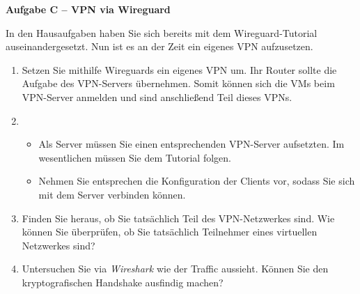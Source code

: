 \documentclass[paper=a4,fontsize=11pt]{scrartcl}%
\numberwithin{equation}{section}
\begin{document}
\begin{center}\Large{\textbf{Aufgabe C -- VPN via Wireguard}}\end{center}\vskip0.25in
In den Hausaufgaben haben Sie sich bereits mit dem Wireguard-Tutorial auseinandergesetzt. Nun ist es an der Zeit ein eigenes VPN aufzusetzen.
\begin{enumerate}
	\item Setzen Sie mithilfe Wireguards ein eigenes VPN um. Ihr Router sollte die Aufgabe des VPN-Servers übernehmen. Somit können sich die VMs beim VPN-Server anmelden und sind anschließend Teil dieses VPNs.
	\item 
	\begin{itemize}
		\item Als Server müssen Sie einen entsprechenden VPN-Server aufsetzten. Im wesentlichen müssen Sie dem Tutorial folgen.
		\item Nehmen Sie entsprechen die Konfiguration der Clients vor, sodass Sie sich mit dem Server verbinden können.
	\end{itemize}
	\item Finden Sie heraus, ob Sie tatsächlich Teil des VPN-Netzwerkes sind. Wie können Sie überprüfen, ob Sie tatsächlich Teilnehmer eines virtuellen Netzwerkes sind?
	\item Untersuchen Sie via \emph{Wireshark} wie der Traffic aussieht. Können Sie den kryptografischen Handshake ausfindig machen?
\end{enumerate}
\end{document}
